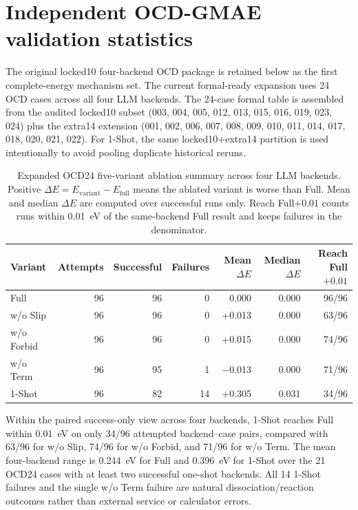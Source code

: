 \documentclass[%
 preprint,
 superscriptaddress,
 amsmath,amssymb,
 aps,
 prb,
 floatfix,
]{revtex4-2}
\begin{document}
\clearpage

\section{Independent OCD-GMAE validation statistics}

The original locked10 four-backend OCD package is retained below as the first complete-energy mechanism set.
The current formal-ready expansion uses 24 OCD cases across all four LLM backends.
The 24-case formal table is assembled from the audited locked10 subset (003, 004, 005, 012, 013, 015, 016, 019, 023, 024) plus the extra14 extension (001, 002, 006, 007, 008, 009, 010, 011, 014, 017, 018, 020, 021, 022).
For 1-Shot, the same locked10+extra14 partition is used intentionally to avoid pooling duplicate historical reruns.

\begin{table}[ht]
\centering
\scriptsize
\caption{Expanded OCD24 five-variant ablation summary across four LLM backends. Positive $\Delta E = E_{\mathrm{variant}} - E_{\mathrm{full}}$ means the ablated variant is worse than Full. Mean and median $\Delta E$ are computed over successful runs only. Reach Full$+0.01$ counts runs within 0.01~eV of the same-backend Full result and keeps failures in the denominator.}
\label{tab:si-ocd24-four-backend-summary}
\begin{tabular}{lrrrrrr}
\toprule
Variant & Attempts & Successful & Failures & Mean $\Delta E$ & Median $\Delta E$ & Reach Full$+0.01$ \\
\midrule
Full & 96 & 96 & 0 & 0.000 & 0.000 & 96/96 \\
w/o Slip & 96 & 96 & 0 & +0.013 & 0.000 & 63/96 \\
w/o Forbid & 96 & 96 & 0 & +0.015 & 0.000 & 74/96 \\
w/o Term & 96 & 95 & 1 & $-$0.013 & 0.000 & 71/96 \\
1-Shot & 96 & 82 & 14 & +0.305 & 0.031 & 34/96 \\
\bottomrule
\end{tabular}
\end{table}

Within the paired success-only view across four backends, 1-Shot reaches Full within 0.01~eV on only 34/96 attempted backend--case pairs, compared with 63/96 for w/o Slip, 74/96 for w/o Forbid, and 71/96 for w/o Term.
The mean four-backend range is 0.244~eV for Full and 0.396~eV for 1-Shot over the 21 OCD24 cases with at least two successful one-shot backends.
All 14 1-Shot failures and the single w/o Term failure are natural dissociation/reaction outcomes rather than external service or calculator errors.
\end{document}
